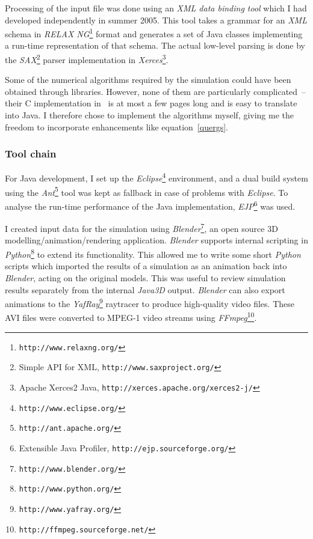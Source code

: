 Processing of the input file was done using an \textsl{XML data binding tool} which I had
developed independently in summer 2005. This tool takes a grammar for an \textsl{XML} schema in
\textsl{RELAX NG}\footnote{\texttt{http://www.relaxng.org/}} format and generates a set of
Java classes implementing a run-time representation of that schema. The actual low-level parsing
is done by the \textsl{SAX}\footnote{Simple API for XML, \texttt{http://www.saxproject.org/}}
parser implementation in \textsl{Xerces}\footnote{Apache Xerces2 Java,
\texttt{http://xerces.apache.org/xerces2-j/}}.

Some of the numerical algorithms required by the simulation could have been obtained through
libraries. However, none of them are particularly complicated~-- their C implementation
in~\cite{NRinC} is at most a few pages long and is easy to translate into Java. I therefore chose
to implement the algorithms myself, giving me the freedom to incorporate enhancements like
equation~\ref{quergs}.

\subsubsection{Tool chain}
For Java development, I set up the \textsl{Eclipse}\footnote{\texttt{http://www.eclipse.org/}}
environment, and a dual build system using the \textsl{Ant}\footnote{\texttt{http://ant.apache.org/}}
tool was kept as fallback in case of problems with \textsl{Eclipse}. To analyse the run-time
performance of the Java implementation,
\textsl{EJP}\footnote{Extensible Java Profiler, \texttt{http://ejp.sourceforge.org/}} was used.

I created input data for the simulation using \textsl{Blender}\footnote{\texttt{http://www.blender.org/}},
an open source 3D modelling/animation/rendering application. \textsl{Blender} supports internal
scripting in \textsl{Python}\footnote{\texttt{http://www.python.org/}} to extend its functionality.
This allowed me to write some short \textsl{Python} scripts which imported the results of a
simulation as an animation back into \textsl{Blender}, acting on the original models. This was useful
to review simulation results separately from the internal \textsl{Java3D} output. \textsl{Blender}
can also export animations to the \textsl{YafRay}\footnote{\texttt{http://www.yafray.org/}}
raytracer to produce high-quality video files. These AVI files were converted to MPEG-1 video
streams using \textsl{FFmpeg}\footnote{\texttt{http://ffmpeg.sourceforge.net/}}.

